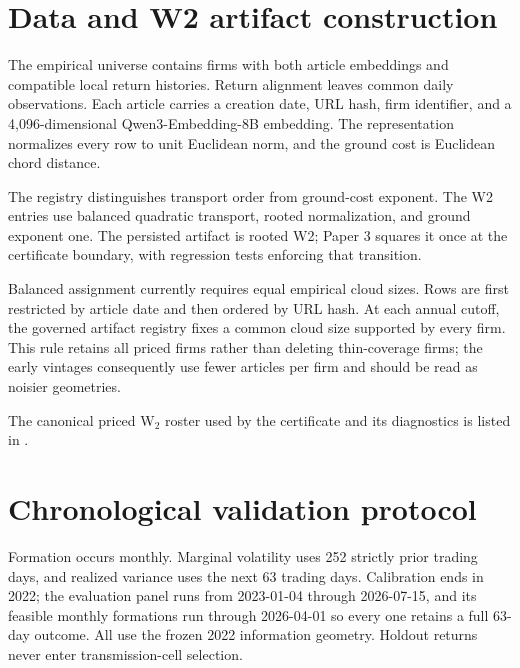 \section{Data and W2 artifact construction}\label{sec:data-appendix}

The empirical universe contains  firms with both article
embeddings and compatible local return histories. Return alignment leaves
 common daily observations.
Each article carries a creation date, URL hash, firm identifier, and a
4,096-dimensional Qwen3-Embedding-8B embedding. The representation normalizes
every row to unit Euclidean norm, and the ground cost is Euclidean chord
distance.

The registry distinguishes transport order from ground-cost exponent. The W2
entries use balanced quadratic transport, rooted normalization, and ground
exponent one. The persisted artifact is rooted W2; Paper 3 squares it once at
the certificate boundary, with regression tests enforcing that transition.

Balanced assignment currently requires equal empirical cloud sizes. Rows are
first restricted by article date and then ordered by URL hash. At each annual
cutoff, the governed artifact registry fixes a common cloud size supported by
every firm. This rule retains all  priced firms rather than
deleting thin-coverage firms; the early vintages consequently use fewer
articles per firm and should be read as noisier geometries.

The canonical priced W$_2$ roster used by the certificate and its diagnostics
is listed in .



\iffalse
\section{Chronological validation protocol}\label{sec:validation-appendix}

Formation occurs monthly. Marginal volatility uses 252 strictly prior trading
days, and realized variance uses the next 63 trading days. Calibration ends in
2022; the evaluation panel runs from 2023-01-04 through 2026-07-15, and its
feasible monthly formations run through 2026-04-01 so every one retains a full
63-day outcome. All use the frozen 2022 information geometry. Holdout returns
never enter transmission-cell selection.

